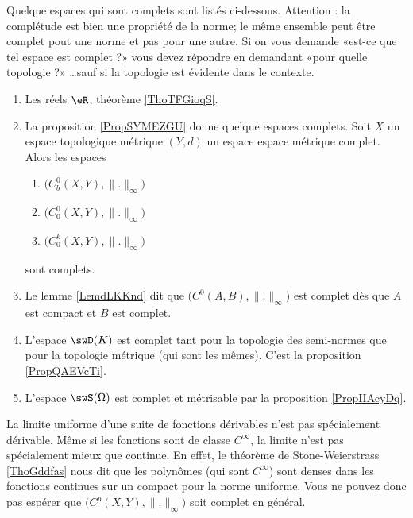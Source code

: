 Quelque espaces qui sont complets sont listés ci-dessous. Attention : la complétude est bien une propriété de la norme; le même ensemble peut être complet pout une norme et pas pour une autre. Si on vous demande «est-ce que tel espace est complet ?» vous devez répondre en demandant «pour quelle topologie ?» \ldots sauf si la topologie est évidente dans le contexte.
\begin{multicols}{2}
    \begin{enumerate}
        \item
            Les réels \( \eR\), théorème \ref{ThoTFGioqS}. 


        \item
            La proposition \ref{PropSYMEZGU} donne quelque espaces complets. Soit \( X\) un espace topologique métrique \( (Y,d)\) un espace espace métrique complet. Alors les espaces
    \begin{enumerate}
        \item
            \( \big( C^0_b(X,Y),\| . \|_{\infty} \big)\) 
        \item
            \( \big( C^0_0(X,Y),\| . \|_{\infty} \big)\)
        \item
            \( \big( C^k_0(X,Y),\| . \|_{\infty} \big)\)
    \end{enumerate} 
    sont complets.

\item
    Le lemme \ref{LemdLKKnd} dit que \( \big( C^0(A,B),\| . \|_{\infty}\big)\) est complet dès que \( A\) est compact et \( B\) est complet.

\item
    L'espace \( \swD(K)\) est complet tant pour la topologie des semi-normes que pour la topologie métrique (qui sont les mêmes). C'est la proposition \ref{PropQAEVcTi}.
\item
    L'espace \( \swS(\Omega)\) est complet et métrisable par la proposition \ref{PropIIAcyDq}.
    \end{enumerate}
\end{multicols}

    La limite uniforme d'une suite de fonctions dérivables n'est pas spécialement dérivable. Même si les fonctions sont de classe \(  C^{\infty}\), la limite n'est pas spécialement mieux que continue. En effet, le théorème de Stone-Weierstrass \ref{ThoGddfas} nous dit que les polynômes (qui sont \(  C^{\infty}\)) sont denses dans les fonctions continues sur un compact pour la norme uniforme. Vous ne pouvez donc pas espérer que \( \big( C^p(X,Y),\| . \|_{\infty} \big)\) soit complet en général.
